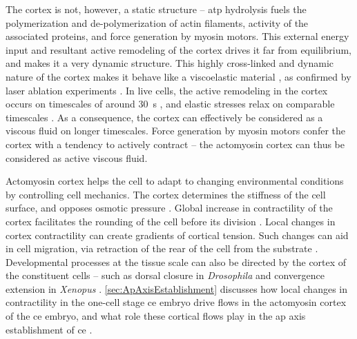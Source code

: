 The cortex is not, however, a static structure -- \ac{atp} hydrolysis fuels the polymerization and de-polymerization of actin filaments, activity of the associated proteins, and force generation by myosin motors. This external energy input and resultant active remodeling of the cortex drives it far from equilibrium, and makes it a very dynamic structure. This highly cross-linked and dynamic nature of the cortex makes it behave like a viscoelastic material \citep{kumar2021actomyosin,salbreux2012actin}, as confirmed by laser ablation experiments \citep{saha2016determining,mayer2010anisotropies}. In live cells, the active remodeling in the cortex occurs on timescales of around \SI{30}{\second} \citep{fritzsche2016actin}, and elastic stresses relax on comparable timescales \citep{saha2016determining}. As a consequence, the cortex can effectively be considered as a viscous fluid on longer timescales. Force generation by myosin motors confer the cortex with a tendency to actively contract \citep{carlsson2006contractile} -- the actomyosin cortex can thus be considered as active viscous fluid.

Actomyosin cortex helps the cell to adapt to changing environmental conditions by controlling cell mechanics. The cortex determines the stiffness of the cell surface, and opposes osmotic pressure \citep{stewart2011hydrostatic}. Global increase in contractility of the cortex facilitates the rounding of the cell before its division \citep{kunda2008moesin}. Local changes in cortex contractility can create gradients of cortical tension. Such changes can aid in cell migration, via retraction of the rear of the cell from the substrate \citep{vicente2009non}. Developmental processes at the tissue scale can also be directed by the cortex of the constituent cells \citep{rauzi2011cortical} -- such as dorsal closure in \textit{Drosophila} \citep{martin2010pulsation} and convergence extension in \textit{Xenopus} \citep{zhou2009actomyosin}. \autoref{sec:ApAxisEstablishment} discusses how local changes in contractility in the one-cell stage \ac{ce} embryo drive flows in the actomyosin cortex of the \ac{ce} embryo, and what role these cortical flows play in the \ac{ap} axis establishment of \ac{ce} \citep{mayer2010anisotropies}.

